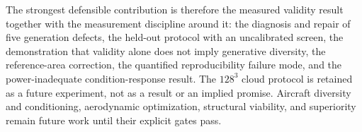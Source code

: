 The strongest defensible contribution is therefore the measured validity result together with the measurement discipline around it: the diagnosis and repair of five generation defects, the held-out protocol with an uncalibrated screen, the demonstration that validity alone does not imply generative diversity, the reference-area correction, the quantified reproducibility failure mode, and the power-inadequate condition-response result. The \(128^3\) cloud protocol is retained as a future experiment, not as a result or an implied promise. Aircraft diversity and conditioning, aerodynamic optimization, structural viability, and superiority remain future work until their explicit gates pass.
